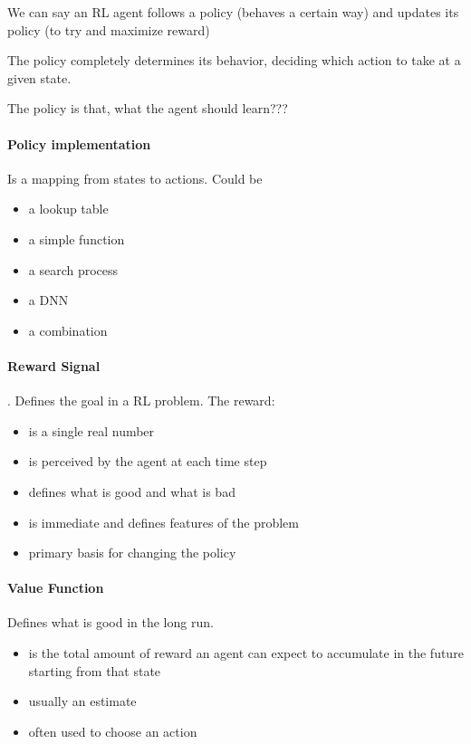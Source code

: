 \documentclass[10pt,a4paper]{article}
\begin{document}
We can say an RL agent follows a policy (behaves a certain way) and updates its policy (to try and maximize reward)

The policy completely determines its behavior, deciding which action to take at a given state.

The policy is that, what the agent should learn???

\paragraph{Policy implementation} Is a mapping from states to actions. Could be
\begin{itemize}
\item a lookup table
\item a simple function
\item a search process
\item a DNN
\item a combination
\end{itemize}

\paragraph{Reward Signal}. Defines the goal in a RL problem. The reward:
\begin{itemize}
\item is a single real number
\item is perceived by the agent at each time step
\item defines what is good and what is bad
\item is immediate and defines features of the problem
\item primary basis for changing the policy
\end{itemize}

\paragraph{Value Function} Defines what is good in the long run. 
\begin{itemize}
\item is the total amount of reward an agent can expect to accumulate in the future starting from that state
\item usually an estimate
\item often used to choose an action
\end{itemize}
\end{document}
